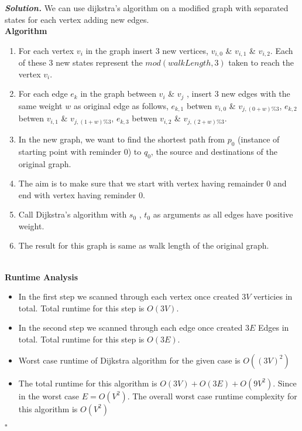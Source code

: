 \documentclass[12pt]{article}
\newenvironment{solution}[1][\it{Solution}]{\textbf{#1. } }{$\square$}
\begin{document}
\begin{solution}
	We can use dijkstra's algorithm on a modified graph with separated states for each vertex adding new edges. 
 \\ \textbf{Algorithm}\\
 \begin{enumerate}
     \item For each vertex $v_i$ in the graph insert 3 new vertices, $v_{i,0}$ \& $v_{i,1}$ \& $v_{i,2}$. Each of these 3 new states represent the $mod(walkLength,3)$ taken to reach the vertex $v_i$. 
     \item For each edge $e_k$ in the graph between $v_i$ \& $v_j$ , insert 3 new edges with the same weight $w$ as original edge as follows,  $e_{k,1}$ betwen $v_{i,0}$ \&  $v_{j,(0+w)\%3}$, $e_{k,2}$ betwen $v_{i,1}$ \&  $v_{j,(1+w)\%3}$, $e_{k,3}$ betwen $v_{i,2}$ \&  $v_{j,(2+w)\%3}$.
     \item In the new graph, we want to find the shortest path from $p_{0}$ (instance of starting point with reminder $0$) to $q_{0}$, the source and destinations of the original graph. 
     \item The aim is to make sure that we start with vertex having remainder $0$ and end with vertex having reminder $0$. 
     \item Call Dijkstra's algorithm with $s_{0}$ , $t_{0}$ as arguments as all edges have positive weight. 
     \item The result for this graph is same as walk length of the original graph.
 \end{enumerate}
 \\ \textbf{Runtime Analysis} \\
 \begin{itemize}
     \item In the first step we scanned through each vertex once created $3V$ verticies in total. Total runtime for this step is $O(3V)$. 
     \item In the second step we scanned through each edge once created $3E$ Edges in total. Total runtime for this step is $O(3E)$.
     \item Worst case runtime of Dijkstra algorithm for the given case is $O((3V)^2)$
     \item The total runtime for this algorithm is $O(3V)+O(3E)+O(9V^2)$. Since in the worst case $E = O(V^2)$. The overall worst case runtime complexity for this algorithm is $O(V^2)$
 \end{itemize}
\end{solution} 
\end{document}
